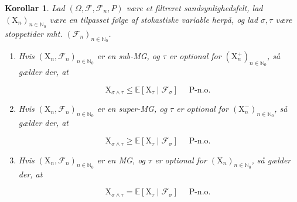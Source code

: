 \documentclass{article}
\newcommand{\1}{\mathbbm{1}}
\theoremstyle{boxed}
\newtheorem{corollary}[theorem]{Korollar}
\begin{document}
\begin{theorem-box}
    \begin{corollary}
        Lad $\left(\Omega, \mathcal{F}, \mathcal{F}_n, P\right)$ være et filtreret sandsynlighedsfelt, lad $\left(\mathrm{X}_n\right)_{n \in \mathbb{N}_0}$ være en tilpasset følge af stokastiske variable herpå, og lad $\sigma, \tau$ være stoppetider mht. $\left(\mathcal{F}_n\right)_{n \in \mathbb{N}_0}$.
        \begin{enumerate}
            \item[\textnormal{(i)}] Hvis $\left(\mathrm{X}_n, \mathcal{F}_n\right)_{n \in \mathbb{N}_0}$ er en sub-MG, og $\tau$ er optional for $\left(\mathrm{X}_n^{+}\right)_{n \in \mathbb{N}_0}$, så gælder der, at

$$
\mathrm{X}_{\sigma \wedge \tau} \leq \mathbb{E}\left[\mathrm{X}_\tau \mid \mathcal{F}_\sigma\right] \quad \text { P-n.o. }
$$
            \item[\textnormal{(ii)}] Hvis $\left(\mathrm{X}_n, \mathcal{F}_n\right)_{n \in \mathbb{N}_0}$ er en super-MG, og $\tau$ er optional for $\left(\mathrm{X}_n^{-}\right)_{n \in \mathbb{N}_0}$, så gælder der, at

$$
\mathrm{X}_{\sigma \wedge \tau} \geq \mathbb{E}\left[\mathrm{X}_\tau \mid \mathcal{F}_\sigma\right] \quad \text { P-n.o. }
$$

            \item[\textnormal{(iii)}] Hvis $\left(\mathrm{X}_n, \mathcal{F}_n\right)_{n \in \mathbb{N}_0}$ er en MG, og $\tau$ er optional for $\left(\mathrm{X}_n\right)_{n \in \mathbb{N}_0}$, så gælder der, at

$$
\mathrm{X}_{\sigma \wedge \tau}=\mathbb{E}\left[\mathrm{X}_\tau \mid \mathcal{F}_\sigma\right] \quad \text { P-n.o. }
$$

        \end{enumerate}
    \end{corollary}
\end{theorem-box}
\end{document}
